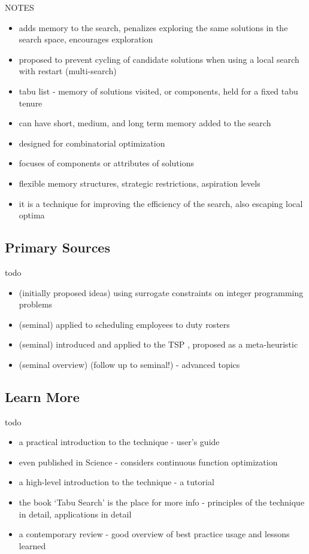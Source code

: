 \documentclass[a4paper, 11pt]{article}
\begin{document}
NOTES
\begin{itemize}
	\item adds memory to the search, penalizes exploring the same solutions in the search space, encourages exploration
	\item proposed to prevent cycling of candidate solutions when using a local search with restart (multi-search)
	\item tabu list - memory of solutions visited, or components, held for a fixed tabu tenure 
	\item can have short, medium, and long term memory added to the search
	\item designed for combinatorial optimization
	\item focuses of components or attributes of solutions
	\item flexible memory structures, strategic restrictions, aspiration levels
	\item it is a technique for improving the efficiency of the search, also escaping local optima
\end{itemize}

% 
% 
\subsection{Primary Sources}
todo

\begin{itemize}
	\item (initially proposed ideas) using surrogate constraints on integer programming problems \cite{Glover1977}
	\item (seminal) applied to scheduling employees to duty rosters \cite{Glover1986a}
	\item (seminal) introduced and applied to the TSP \cite{Glover1986}, proposed as a meta-heuristic
	\item (seminal overview) \cite{Glover1989} (follow up to seminal!) \cite{Glover1990} - advanced topics
\end{itemize}

% 
% 
\subsection{Learn More}
todo

\begin{itemize}
	\item a practical introduction to the technique \cite{Glover1993} - user's guide
	\item even published in Science \cite{Cvijovic1995} - considers continuous function optimization
	\item a high-level introduction to the technique \cite{Glover1990a} - a tutorial
	\item the book `Tabu Search' is the place for more info \cite{Glover1998} - principles of the technique in detail, applications in detail
	\item a contemporary review \cite{Gendreau2003} - good overview of best practice usage and lessons learned
\end{itemize}
\end{document}
